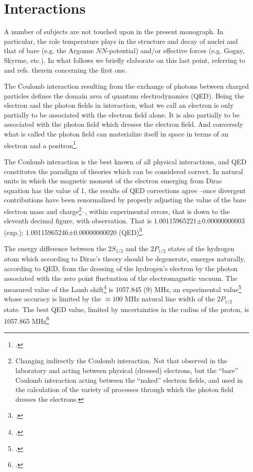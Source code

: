 \section{Interactions}\label{S1.9}
A number of subjects are not touched upon in the present monograph. In particular, the role temperature plays in the structure and decay of nuclei and that of bare (e.g. the Argonne $NN$-potential) and/or effective forces (e.g. Gogny, Skyrme, etc.). In what follows we briefly elaborate on this last point, referring to \cite{Bortignon:98} and refs. therein concerning the first one.

The Coulomb interaction resulting from the exchange of photons between charged particles defines the domain area of quantum electrodynamics (QED). Being the electron and the photon fields in interaction, what we call an electron is only partially to be associated with the electron field alone. It is also partially to be associated with the photon field which dresses the electron field. And conversely what is called the photon field can materialize itself in space in terms of an electron and a positron\footnote{\cite{Schwinger:01}.}.

The Coulomb interaction is the best known of all physical interactions, and QED constitutes the paradigm of theories which can be considered correct. In natural units in which the magnetic moment of the electron emerging from Dirac equation has the value of 1, the results of QED corrections agree --once divergent contributions have been renormalized by properly adjusting the value of the bare electron mass and charge\footnote{Changing indirectly the Coulomb interaction. Not that observed in the laboratory and acting between physical (dressed) electrons, but the ``bare'' Coulomb interaction acting between the ``naked'' electron fields, and used in the calculation of the variety of processes through which the photon field dresses the electrons.}--, within experimental errors, that is down to the eleventh decimal figure, with observation. That is 1.00115965221$\pm$0.00000000003 (exp.); 1.00115965246$\pm$0.00000000020 (QED)\footnote{\cite{Kinoshita:90}.}.


 The energy difference between the $2S_{1/2}$ and the $2P_{1/2}$ states of the hydrogen atom which according to Dirac's theory should be degenerate, emerges naturally, according to QED, from the dressing of the hydrogen's electron by the photon associated with the zero point fluctuation of the electromagnetic vacuum. The measured value of the Lamb shift\footnote{\cite{Lamb:51b}.}  is 1057.845 (9) MHz, an experimental value\footnote{\cite{Lundeen:81,Lundeen:86,Pipkin:90}.} whose accuracy is limited by the $\approx 100$ MHz natural line width of the $2P_{1/2}$ state. The best QED value, limited by uncertainties in the radius of the proton, is 1057.865 MHz\footnote{\cite{Sapirstein:90,Grotch:94}.}

